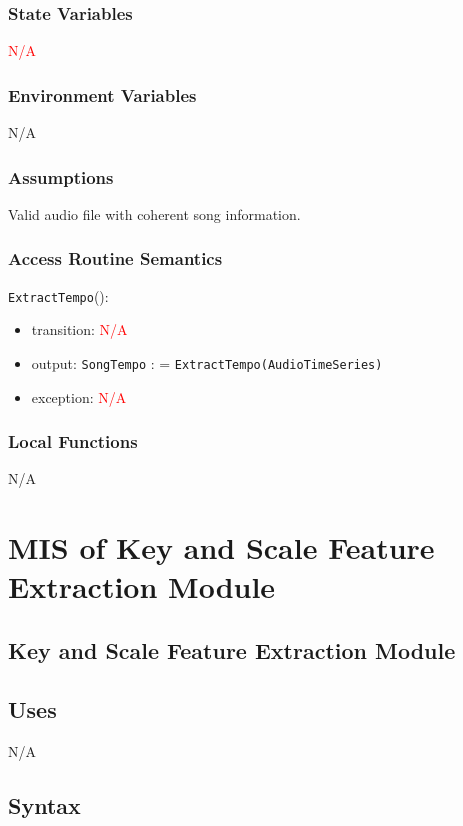 \documentclass[12pt, titlepage]{article}
\begin{document}
\subsubsection{State Variables}
\textcolor{red}{N/A}

\subsubsection{Environment Variables}
N/A

\subsubsection{Assumptions}
Valid audio file with coherent song information.

\subsubsection{Access Routine Semantics}

\noindent \texttt{ExtractTempo}():
\begin{itemize}
\item transition: \textcolor{red}{N/A}
\item output: \texttt{SongTempo} : = \texttt{ExtractTempo(Audio\textunderscore Time\textunderscore Series)}
\item exception: \textcolor{red}{N/A}
\end{itemize}

\subsubsection{Local Functions}
N/A



\section{MIS of Key and Scale Feature Extraction Module} 

\subsection{Key and Scale Feature Extraction Module}

\subsection{Uses}
N/A

\subsection{Syntax}
\end{document}
